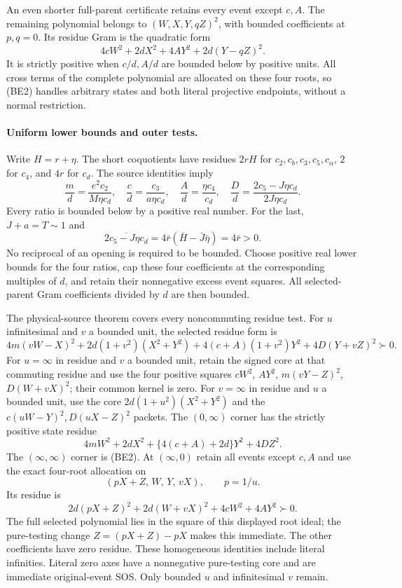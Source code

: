 An even shorter full-parent certificate retains every event except
$c,A$. The remaining polynomial belongs to $(W,X,Y,qZ)^2$, with bounded
coefficients at $p,q=0$. Its residue Gram is the quadratic form
\[
 4cW^2+2dX^2+4AY^2+2d(Y-qZ)^2.                 \tag{BE2}
\]
It is strictly positive when $c/d,A/d$ are bounded below by positive
units. All cross terms of the complete polynomial are allocated on
these four roots, so (BE2) handles arbitrary states and both literal
projective endpoints, without a normal restriction.

\paragraph{Uniform lower bounds and outer tests.}
Write $H=r+\eta$. The short coquotients have residues $2rH$ for
$c_2,c_b,c_3,c_5,c_\alpha$, $2$ for $c_4$, and $4r$ for $c_d$.
The source identities imply
\[
 \frac md=\frac{e^2c_2}{M\eta c_d},\quad
 \frac cd=\frac{c_3}{a\eta c_d},\quad
 \frac Ad=\frac{\eta c_4}{c_d},\quad
 \frac Dd=\frac{2c_5-J\eta c_d}{2J\eta c_d}.
 \tag{BE3}
\]
Every ratio is bounded below by a positive real number. For the last,
$J+a=T\sim1$ and
\[
 \overline{2c_5-J\eta c_d}=4\bar r(\bar H-\bar J\bar\eta)
 =4\bar r>0.
\]
No reciprocal of an opening is required to be bounded. Choose positive
real lower bounds for the four ratios, cap these four coefficients at
the corresponding multiples of $d$, and retain their nonnegative
excess event squares. All selected-parent Gram coefficients divided
by $d$ are then bounded.

The physical-source theorem covers every noncommuting residue test.
For $u$ infinitesimal and $v$ a bounded unit, the selected residue form is
\[
 4m(vW-X)^2+2d(1+v^2)(X^2+Y^2)
 +4(c+A)(1+v^2)Y^2+4D(Y+vZ)^2\succ0.
\]
For $u=\infty$ in residue and $v$ a bounded unit, retain the signed
core at that commuting residue and use the four positive squares
$cW^2$, $AY^2$, $m(vY-Z)^2$, $D(W+vX)^2$; their common kernel is zero.
For $v=\infty$ in residue and $u$ a bounded unit, use the core
$2d(1+u^2)(X^2+Y^2)$ and the $c(uW-Y)^2,D(uX-Z)^2$ packets.
The $(0,\infty)$ corner has the strictly positive state residue
\[
 4mW^2+2dX^2+\{4(c+A)+2d\}Y^2+4DZ^2.
\]
The $(\infty,\infty)$ corner is (BE2).
At $(\infty,0)$ retain all events except $c,A$ and use the exact
four-root allocation on
\[
 (pX+Z,\,W,\,Y,\,vX),\qquad p=1/u.
\]
Its residue is
\[
 2d(pX+Z)^2+2d(W+vX)^2+4cW^2+4AY^2\succ0.
\]
The full selected polynomial lies in the square of this displayed
root ideal; the pure-testing change $Z=(pX+Z)-pX$ makes this immediate.
The other coefficients have zero residue. These homogeneous
identities include literal infinities. Literal zero axes have a
nonnegative pure-testing core and are immediate original-event SOS.
Only bounded $u$ and infinitesimal $v$ remain.

